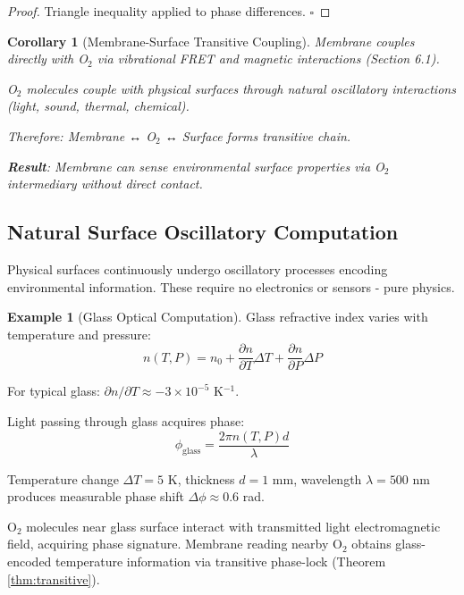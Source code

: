 \documentclass[11pt,a4paper]{article}
\newtheorem{corollary}[theorem]{Corollary}
\theoremstyle{definition}
\newtheorem{example}[theorem]{Example}
\theoremstyle{remark}
\begin{document}
\begin{proof}
Triangle inequality applied to phase differences. $\square$
\end{proof}

\begin{corollary}[Membrane-Surface Transitive Coupling]
Membrane couples directly with O$_2$ via vibrational FRET and magnetic interactions (Section 6.1).

O$_2$ molecules couple with physical surfaces through natural oscillatory interactions (light, sound, thermal, chemical).

Therefore: Membrane ↔ O$_2$ ↔ Surface forms transitive chain.

\textbf{Result}: Membrane can sense environmental surface properties via O$_2$ intermediary without direct contact.
\end{corollary}

\subsection{Natural Surface Oscillatory Computation}

Physical surfaces continuously undergo oscillatory processes encoding environmental information. These require no electronics or sensors - pure physics.

\begin{example}[Glass Optical Computation]
Glass refractive index varies with temperature and pressure:
\begin{equation}
n(T,P) = n_0 + \frac{\partial n}{\partial T}\Delta T + \frac{\partial n}{\partial P}\Delta P
\end{equation}

For typical glass: $\partial n/\partial T \approx -3 \times 10^{-5}$ K$^{-1}$.

Light passing through glass acquires phase:
\begin{equation}
\phi_{\text{glass}} = \frac{2\pi n(T,P) d}{\lambda}
\end{equation}

Temperature change $\Delta T = 5$ K, thickness $d = 1$ mm, wavelength $\lambda = 500$ nm produces measurable phase shift $\Delta\phi \approx 0.6$ rad.

O$_2$ molecules near glass surface interact with transmitted light electromagnetic field, acquiring phase signature. Membrane reading nearby O$_2$ obtains glass-encoded temperature information via transitive phase-lock (Theorem \ref{thm:transitive}).
\end{example}
\end{document}
